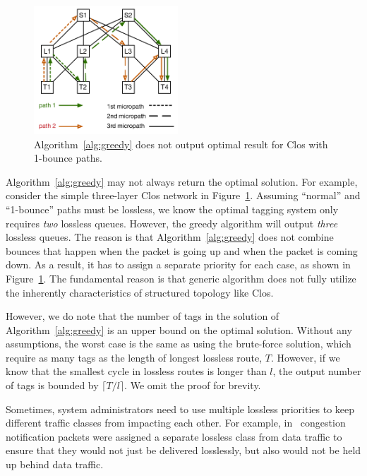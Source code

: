 \begin{figure}[t]
	\centering
	\includegraphics[width=0.48\textwidth] {figs/nonoptimal_example}
	\caption{Algorithm~\ref{alg:greedy} does not output optimal result for Clos with 1-bounce paths.}
	\label{fig:nonoptimal}
\end{figure}

Algorithm~\ref{alg:greedy} may not always return the optimal solution. For example, 
consider the simple three-layer Clos network in Figure~\ref{fig:nonoptimal}. 
Assuming ``normal'' and ``1-bounce'' paths must be lossless,  
we know the optimal tagging system only requires {\em two} lossless queues. However, the 
greedy algorithm will output {\em three} lossless queues. The reason is that 
Algorithm~\ref{alg:greedy} does not combine bounces that happen when the packet is going up
and when the packet is coming down. As a result, it has to 
assign a separate priority for each case, as shown in Figure~\ref{fig:nonoptimal}.
The fundamental reason is that generic algorithm does not fully utilize the inherently 
characteristics of structured topology like Clos. 

However, we do note that the number of tags in the solution of
Algorithm~\ref{alg:greedy} is an upper bound on the optimal solution.  Without
any assumptions, the worst case is the same as using the brute-force solution,
which require as many tags as the length of longest lossless route, $T$.
However, if we know that the smallest cycle in lossless routes is longer than
$l$, the output number of tags is bounded by $\lceil T/l \rceil$. We omit the
proof for brevity.

 Sometimes, system administrators need to
use multiple lossless priorities to keep different traffic classes from impacting each
other. For example, in~\cite{dcqcn} congestion notification packets were
assigned a separate lossless class from data traffic to ensure that they would
not just be delivered losslessly, but also would not be held up behind data
traffic.


